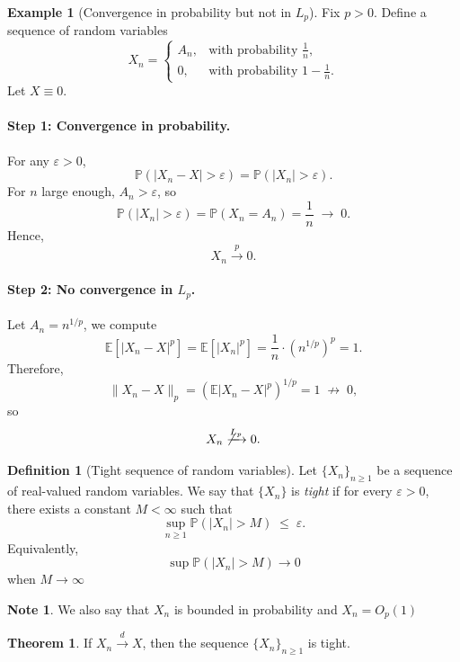 \documentclass[11pt]{article}
\theoremstyle{definition}
\newtheorem{defn}{Definition}[section]
\newtheorem{note}{Note}[section]
\newtheorem{exmp}{Example}[section]
\newtheorem{theo}{Theorem}[section]
\begin{document}
\begin{exmp}[Convergence in probability but not in $L_p$]
Fix $p>0$. Define a sequence of random variables
\[
X_n =
\begin{cases}
A_n, & \text{with probability } \frac{1}{n},\\[6pt]
0, & \text{with probability } 1 - \frac{1}{n}.
\end{cases}
\]
Let $X \equiv 0$.

\paragraph{Step 1: Convergence in probability.}
For any $\varepsilon > 0$,
\[
\mathbb{P}(|X_n - X| > \varepsilon)
=
\mathbb{P}(|X_n| > \varepsilon).
\]
For $n$ large enough, $A_n > \varepsilon$, so
\[
\mathbb{P}(|X_n| > \varepsilon)
=
\mathbb{P}(X_n = A_n)
=
\frac{1}{n}
\;\longrightarrow\; 0.
\]
Hence,
\[
X_n \xrightarrow{p} 0.
\]

\paragraph{Step 2: No convergence in $L_p$.}
Let $A_n = n^{1/p}$, we compute
\[
\mathbb{E}\!\left[|X_n - X|^p\right]
=
\mathbb{E}\!\left[|X_n|^p\right]
=
\frac{1}{n} \cdot (n^{1/p})^p
=
1.
\]
Therefore,
\[
\|X_n - X\|_p
=
\left( \mathbb{E}|X_n - X|^p \right)^{1/p}
=
1 \;\not\to\; 0,
\]
so
\[
X_n \not\xrightarrow{L_p} 0.
\]
\end{exmp}

\begin{defn}[Tight sequence of random variables]
Let $\{X_n\}_{n\ge 1}$ be a sequence of real-valued random variables. We say that $\{X_n\}$ is \emph{tight} if for every $\varepsilon > 0$, there exists
a constant $M < \infty$ such that
\[
\sup_{n \ge 1} \mathbb{P}(|X_n| > M)
\;\le\;
\varepsilon.
\]
Equivalently,
\[
\sup \mathbb{P}(|X_n| > M)\rightarrow0
\]
when $M\rightarrow\infty$
\end{defn}
\begin{note}
    We also say that $X_n$ is bounded in probability and $X_n=O_p(1)$
\end{note}
\begin{theo}
If $X_n \xrightarrow{d} X$, then the sequence
$\{X_n\}_{n\ge 1}$ is tight.
\end{theo}
\end{document}

